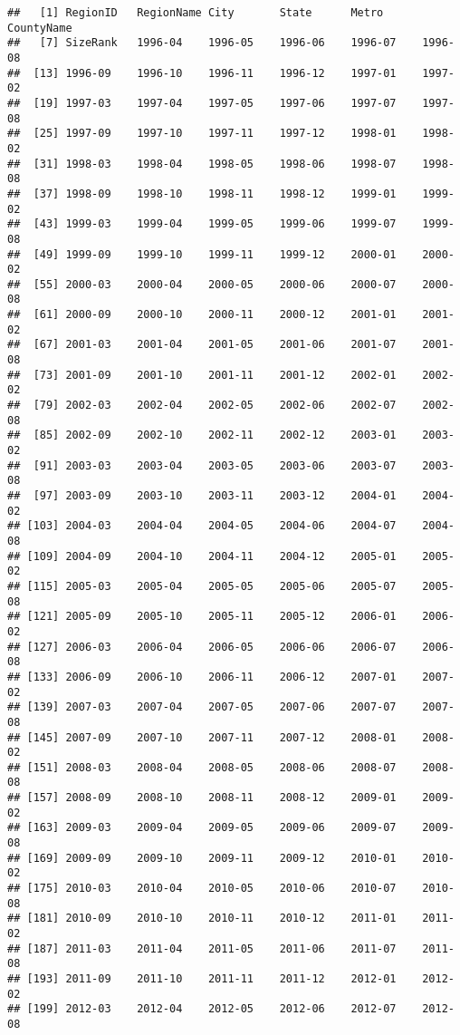 \documentclass[
]{article}
\begin{document}
\begin{verbatim}
##   [1] RegionID   RegionName City       State      Metro      CountyName
##   [7] SizeRank   1996-04    1996-05    1996-06    1996-07    1996-08   
##  [13] 1996-09    1996-10    1996-11    1996-12    1997-01    1997-02   
##  [19] 1997-03    1997-04    1997-05    1997-06    1997-07    1997-08   
##  [25] 1997-09    1997-10    1997-11    1997-12    1998-01    1998-02   
##  [31] 1998-03    1998-04    1998-05    1998-06    1998-07    1998-08   
##  [37] 1998-09    1998-10    1998-11    1998-12    1999-01    1999-02   
##  [43] 1999-03    1999-04    1999-05    1999-06    1999-07    1999-08   
##  [49] 1999-09    1999-10    1999-11    1999-12    2000-01    2000-02   
##  [55] 2000-03    2000-04    2000-05    2000-06    2000-07    2000-08   
##  [61] 2000-09    2000-10    2000-11    2000-12    2001-01    2001-02   
##  [67] 2001-03    2001-04    2001-05    2001-06    2001-07    2001-08   
##  [73] 2001-09    2001-10    2001-11    2001-12    2002-01    2002-02   
##  [79] 2002-03    2002-04    2002-05    2002-06    2002-07    2002-08   
##  [85] 2002-09    2002-10    2002-11    2002-12    2003-01    2003-02   
##  [91] 2003-03    2003-04    2003-05    2003-06    2003-07    2003-08   
##  [97] 2003-09    2003-10    2003-11    2003-12    2004-01    2004-02   
## [103] 2004-03    2004-04    2004-05    2004-06    2004-07    2004-08   
## [109] 2004-09    2004-10    2004-11    2004-12    2005-01    2005-02   
## [115] 2005-03    2005-04    2005-05    2005-06    2005-07    2005-08   
## [121] 2005-09    2005-10    2005-11    2005-12    2006-01    2006-02   
## [127] 2006-03    2006-04    2006-05    2006-06    2006-07    2006-08   
## [133] 2006-09    2006-10    2006-11    2006-12    2007-01    2007-02   
## [139] 2007-03    2007-04    2007-05    2007-06    2007-07    2007-08   
## [145] 2007-09    2007-10    2007-11    2007-12    2008-01    2008-02   
## [151] 2008-03    2008-04    2008-05    2008-06    2008-07    2008-08   
## [157] 2008-09    2008-10    2008-11    2008-12    2009-01    2009-02   
## [163] 2009-03    2009-04    2009-05    2009-06    2009-07    2009-08   
## [169] 2009-09    2009-10    2009-11    2009-12    2010-01    2010-02   
## [175] 2010-03    2010-04    2010-05    2010-06    2010-07    2010-08   
## [181] 2010-09    2010-10    2010-11    2010-12    2011-01    2011-02   
## [187] 2011-03    2011-04    2011-05    2011-06    2011-07    2011-08   
## [193] 2011-09    2011-10    2011-11    2011-12    2012-01    2012-02   
## [199] 2012-03    2012-04    2012-05    2012-06    2012-07    2012-08   

\end{verbatim}
\end{document}
